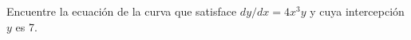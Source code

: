 \item Encuentre la ecuación de la curva que satisface $dy/dx = 4x^3 y$ y cuya intercepción $y$ es 7.
